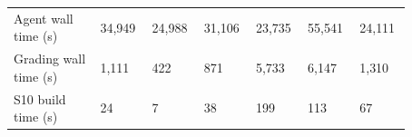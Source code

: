 \begin{table}[t]
\begin{tabular}{p{0.2\linewidth}p{0.112\linewidth}p{0.112\linewidth}p{0.112\linewidth}p{0.112\linewidth}p{0.112\linewidth}p{0.112\linewidth}}
\raggedright\hspace{0pt}Agent wall time (s) & \raggedright\hspace{0pt}34{,}949 & \raggedright\hspace{0pt}24{,}988 & \raggedright\hspace{0pt}31{,}106 & \raggedright\hspace{0pt}23{,}735 & \raggedright\hspace{0pt}55{,}541 & \raggedright\hspace{0pt}24{,}111 \tabularnewline
\raggedright\hspace{0pt}Grading wall time (s) & \raggedright\hspace{0pt}1{,}111 & \raggedright\hspace{0pt}422 & \raggedright\hspace{0pt}871 & \raggedright\hspace{0pt}5{,}733 & \raggedright\hspace{0pt}6{,}147 & \raggedright\hspace{0pt}1{,}310 \tabularnewline
\raggedright\hspace{0pt}S10 build time (s) & \raggedright\hspace{0pt}24 & \raggedright\hspace{0pt}7 & \raggedright\hspace{0pt}38 & \raggedright\hspace{0pt}199 & \raggedright\hspace{0pt}113 & \raggedright\hspace{0pt}67 \tabularnewline
\bottomrule\end{tabular}\end{table}
